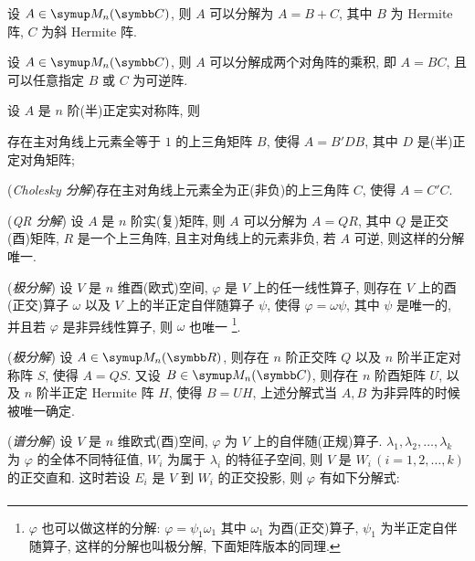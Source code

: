     \begin{tcolorbox}[title={矩阵/线性算子分解}]
        \begin{exercise}[resume=exer]
            \item 设 $ A \in \MM[\C] $, 则 $ A $ 可以分解为 $ A = B + C $, 其中 $ B $ 为 Hermite 阵, $ C $ 为斜 Hermite 阵.
            \item 设 $ A\in \MM[\C] $, 则 $ A $ 可以分解成两个对角阵的乘积, 即 $ A = BC $, 且可以任意指定 $ B $ 或 $ C $ 为可逆阵.
            \item 设 $ A $ 是 $ n $ 阶(半)正定实对称阵, 则
            \begin{exercise}
                \item 存在主对角线上元素全等于 $ 1 $ 的上三角矩阵 $ B $, 使得 $ A = B'DB $, 其中 $ D $ 是(半)正定对角矩阵;
                \item (\emph{Cholesky 分解})存在主对角线上元素全为正(非负)的上三角阵 $ C $, 使得 $ A = C'C $. 
            \end{exercise}
            \item (\emph{QR 分解}) 设 $ A $ 是 $ n $ 阶实(复)矩阵, 则 $ A $ 可以分解为 $ A = QR $, 其中 $ Q $ 是正交(酉)矩阵, $ R $ 是一个上三角阵, 且主对角线上的元素非负, 若 $ A $ 可逆, 则这样的分解唯一.
            \item (\emph{极分解}) 设 $ V $ 是 $ n $ 维酉(欧式)空间, $ \varphi $ 是 $ V $ 上的任一线性算子, 则存在 $ V $ 上的酉(正交)算子 $ \omega $ 以及 $ V $ 上的半正定自伴随算子 $ \psi $, 使得 $ \varphi = \omega\psi $, 其中 $ \psi $ 是唯一的, 并且若 $ \varphi $ 是非异线性算子, 则 $ \omega $ 也唯一 \footnote{ $ \varphi $ 也可以做这样的分解: $ \varphi = \psi_{1}\omega_{1} $ 其中 $ \omega_{1} $ 为酉(正交)算子, $ \psi_{1} $ 为半正定自伴随算子, 这样的分解也叫极分解, 下面矩阵版本的同理.}. 
            \item \label{item:矩阵极分解}(\emph{极分解}) 设 $ A \in \MM $, 则存在 $ n $ 阶正交阵 $ Q $ 以及 $ n $ 阶半正定对称阵 $ S $, 使得 $ A = QS $. 又设 $ B \in \MM[\C] $, 则存在 $ n $ 阶酉矩阵 $ U $, 以及 $ n $ 阶半正定 Hermite 阵 $ H $, 使得 $ B = UH $, 上述分解式当 $ A, B $ 为非异阵的时候被唯一确定.
            \item (\emph{谱分解}) 设 $ V $ 是 $ n $ 维欧式(酉)空间, $ \varphi $ 为 $ V $ 上的自伴随(正规)算子. $ \lambda_{1}, \lambda_{2}, \dots, \lambda_{k} $ 为 $ \varphi $ 的全体不同特征值, $ W_{i} $ 为属于 $ \lambda_{i} $ 的特征子空间, 则 $ V $ 是 $ W_{i}\,(i = 1, 2, \dots, k) $ 的正交直和. 这时若设 $ E_{i} $ 是 $ V $ 到 $ W_{i} $ 的正交投影, 则 $ \varphi $ 有如下分解式:
            \begin{align*}

\end{align*}
\end{exercise}
\end{tcolorbox}
